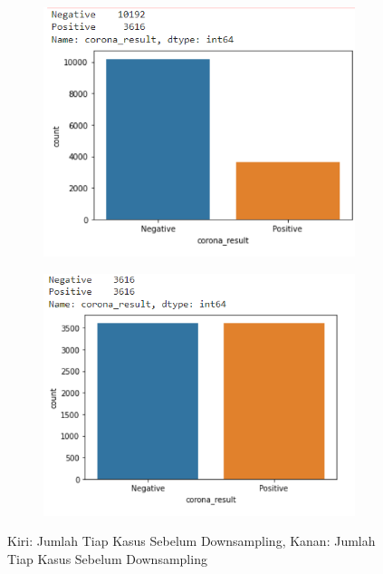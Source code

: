 \begin{figure}
\centering
\begin{subfigure}{.5\textwidth}
  \centering
  \includegraphics[width=1\linewidth]{pics/downsampling1.PNG}
\end{subfigure}%
\begin{subfigure}{.5\textwidth}
  \centering
  \includegraphics[width=1\linewidth]{pics/downsampling2.PNG}
\end{subfigure}

\caption{Kiri: Jumlah Tiap Kasus Sebelum Downsampling, Kanan: Jumlah Tiap Kasus Sebelum Downsampling}
\label{downsampling}
\end{figure}

